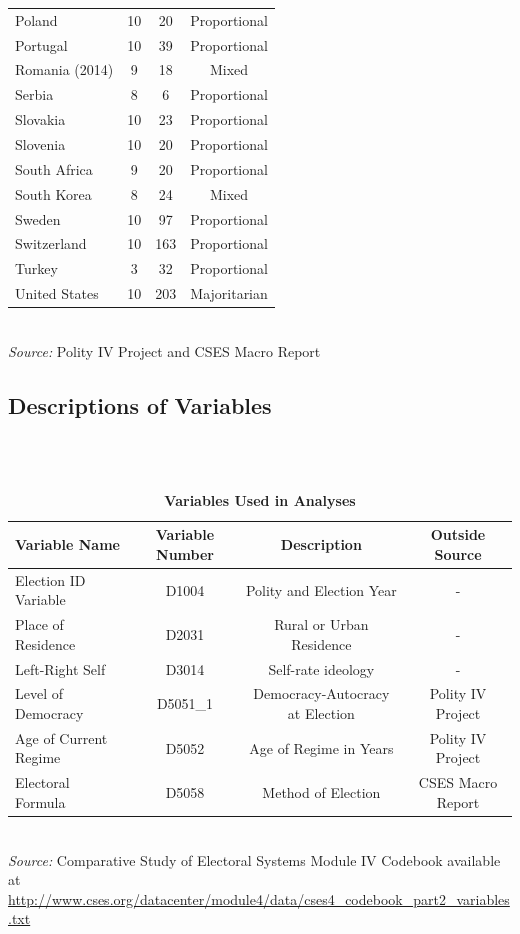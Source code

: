 \documentclass[12pt, titlepage]{article}
\newcommand\e{\emph}
\newcommand\tb{\textbf}
\begin{document}
\begin{appendices}
\begin{table} [h!]
\begin{tabulary}{\linewidth}{l c c c}
		Poland&10&20&Proportional\\
		Portugal&10&39&Proportional\\
		Romania (2014) &9&18& Mixed \\
		Serbia& 8&6&Proportional\\
		Slovakia&10&23&Proportional\\
		Slovenia&10&20&Proportional\\
		South Africa&9&20& Proportional \\
		South Korea&8&24&Mixed\\
		Sweden&10&97&Proportional\\ 
		Switzerland&10&163&Proportional\\
		Turkey&3&32&Proportional\\
		United States&10&203&Majoritarian \\
		\hline
	\end{tabulary}
\\
\e{Source:} Polity IV Project and CSES Macro Report
\label{table101}
\end{table}

\clearpage 

\begin{landscape}
\section{Descriptions of Variables }
\label{AppendixA}

~~~\\\\

\begin{table}[h!]
	\centering
	\def\arraystretch{1.5}
	\caption{\tb{Variables Used in Analyses}}
	\begin{tabulary}{\linewidth}{l c c c}
		\\
		\hline
		\tb{Variable Name}& \tb{Variable Number} & \tb{Description}&\tb{Outside Source} \\
		\hline
		Election ID Variable &D1004&Polity and Election Year&-\\
		Place of Residence&D2031&Rural or Urban Residence&-\\
		Left-Right Self&D3014&Self-rate ideology &-\\
		Level of Democracy&D5051\_1&Democracy-Autocracy at Election&Polity IV Project\\
		Age of Current Regime&D5052&Age of Regime in Years& Polity IV Project\\
		Electoral Formula&D5058&Method of Election&CSES Macro Report\\
		\hline
	\end{tabulary}\\
	\e{Source:} Comparative Study of Electoral Systems Module IV Codebook available at \url{http://www.cses.org/datacenter/module4/data/cses4_codebook_part2_variables.txt}
	\label{table99}
\end{table}


\end{landscape}
\end{appendices}
\end{document}
